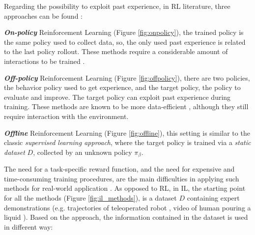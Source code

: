 \newline Regarding the possibility to exploit past experience, in RL literature, three approaches can be found \cite{levine202rl_tutorial}:
\begin{itemize*}
    \item \textbf{\textit{On-policy}} Reinforcement Learning (Figure \ref{fig:onpolicy}), the trained policy is the same policy used to collect data, so, the only used past experience is related to the last policy rollout. These methods require a considerable amount of interactions to be trained \cite{}.
    \item \textbf{\textit{Off-policy}} Reinforcement Learning (Figure \ref{fig:offpolicy}), there are two policies, the behavior policy used to get experience, and the target policy, the policy to evaluate and improve. The target policy can exploit past experience during training. These methods are known to be more data-efficient \cite{}, although they still require interaction with the environment. 
    \item \textbf{\textit{Offline}} Reinforcement Learning (Figure \ref{fig:offline}), this setting is similar to the classic \textit{supervised learning approach}, where the target policy is trained via a \textit{static dataset} $D$, collected by an unknown policy $\pi_{\beta}$.  
\end{itemize*}

\noindent The need for a task-specific reward function, and the need for expensive and time-consuming training procedures, are the main difficulties in applying such methods for real-world application \cite{hussein2017imitation_learning_survey}. 
\newline As opposed to RL, in IL, the starting point for all the methods (Figure \ref{fig:il_methods}), is a dataset $D$ containing expert demonstrations (e.g. trajectories of teleoperated robot \cite{}, video of human pouring a liquid \cite{}). Based on the approach, the information contained in the dataset is used in different way:

